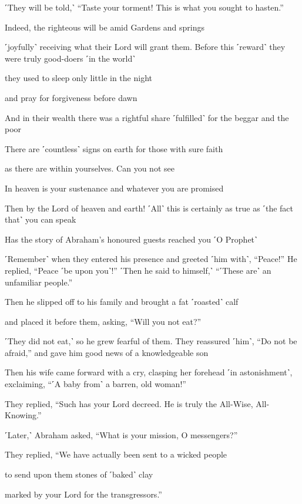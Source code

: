 ˹They will be told,˺ “Taste your torment! This is what you sought to hasten.”

Indeed, the righteous will be amid Gardens and springs

˹joyfully˺ receiving what their Lord will grant them. Before this ˹reward˺ they were truly good-doers ˹in the world˺

they used to sleep only little in the night

and pray for forgiveness before dawn

And in their wealth there was a rightful share ˹fulfilled˺ for the beggar and the poor

There are ˹countless˺ signs on earth for those with sure faith

as there are within yourselves. Can you not see

In heaven is your sustenance and whatever you are promised

Then by the Lord of heaven and earth! ˹All˺ this is certainly as true as ˹the fact that˺ you can speak

Has the story of Abraham’s honoured guests reached you ˹O Prophet˺

˹Remember˺ when they entered his presence and greeted ˹him with˺, “Peace!” He replied, “Peace ˹be upon you˺!” ˹Then he said to himself,˺ “˹These are˺ an unfamiliar people.”

Then he slipped off to his family and brought a fat ˹roasted˺ calf

and placed it before them, asking, “Will you not eat?”

˹They did not eat,˺ so he grew fearful of them. They reassured ˹him˺, “Do not be afraid,” and gave him good news of a knowledgeable son

Then his wife came forward with a cry, clasping her forehead ˹in astonishment˺, exclaiming, “˹A baby from˺ a barren, old woman!”

They replied, “Such has your Lord decreed. He is truly the All-Wise, All-Knowing.”

˹Later,˺ Abraham asked, “What is your mission, O messengers?”

They replied, “We have actually been sent to a wicked people

to send upon them stones of ˹baked˺ clay

marked by your Lord for the transgressors.”

